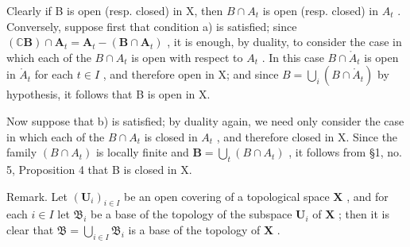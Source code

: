 Clearly if B is open (resp. closed) in X, then \(B \cap A_{t}\) is open (resp. closed) in \(A_{t}\) . Conversely, suppose first that condition a) is satisfied; since \((\mathbb{C}\mathbf{B}) \cap \mathbf{A}_{t} = \mathbf{A}_{t} - (\mathbf{B} \cap \mathbf{A}_{t})\) , it is enough, by duality, to consider the case in which each of the \(B \cap A_{t}\) is open with respect to \(A_{t}\) . In this case \(B \cap \mathring{A}_{t}\) is open in \(\mathring{A}_{t}\) for each \(t \in I\) , and therefore open in X; and since \(B = \bigcup_{i} (B \cap \mathring{A}_{t})\) by hypothesis, it follows that B is open in X.

Now suppose that b) is satisfied; by duality again, we need only consider the case in which each of the \(B \cap A_{t}\) is closed in \(A_{t}\) , and therefore closed in X. Since the family \((B \cap A_{t})\) is locally finite and \(\mathbf{B} = \bigcup_{t} (B \cap A_{t})\) , it follows from §1, no. 5, Proposition 4 that B is closed in X.

Remark. Let \((\mathbf{U}_i)_{i\in I}\) be an open covering of a topological space \(\mathbf{X}\) , and for each \(i\in I\) let \(\mathfrak{B}_i\) be a base of the topology of the subspace \(\mathbf{U}_i\) of \(\mathbf{X}\) ; then it is clear that \(\mathfrak{B} = \bigcup_{i\in I}\mathfrak{B}_i\) is a base of the topology of \(\mathbf{X}\) .

